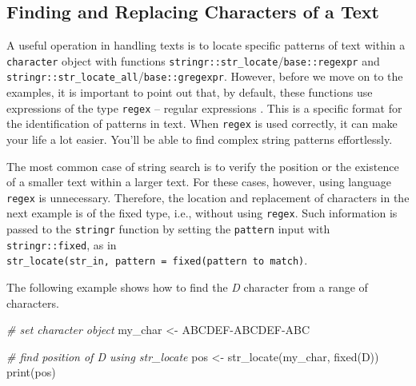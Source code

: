 \documentclass[
  12pt,
]{book}
\newenvironment{Shaded}{\begin{snugshade}}{\end{snugshade}}
\newcommand{\CommentTok}[1]{\textcolor[rgb]{0.37,0.37,0.37}{\textit{#1}}}
\newcommand{\FunctionTok}[1]{\textcolor[rgb]{0,0,0}{#1}}
\newcommand{\NormalTok}[1]{#1}
\newcommand{\OtherTok}[1]{\textcolor[rgb]{0.37,0.37,0.37}{#1}}
\newcommand{\StringTok}[1]{\textcolor[rgb]{0.5,0.5,0.5}{#1}}
\begin{document}
\hypertarget{finding-and-replacing-characters-of-a-text}{%
\subsection{Finding and Replacing Characters of a Text}\label{finding-and-replacing-characters-of-a-text}}

A useful operation in handling texts is to locate specific patterns of text within a \texttt{character} object with functions \texttt{stringr::str\_locate}/\texttt{base::regexpr} and \texttt{stringr::str\_locate\_all}/\texttt{base::gregexpr}. However, before we move on to the examples, it is important to point out that, by default, these functions use expressions of the type \texttt{regex} -- regular expressions \citep{thompson1968programming}. This is a specific format for the identification of patterns in text. When \texttt{regex} is used correctly, it can make your life a lot easier. You'll be able to find complex string patterns effortlessly.

The most common case of string search is to verify the position or the existence of a smaller text within a larger text. For these cases, however, using language \texttt{regex} is unnecessary. Therefore, the location and replacement of characters in the next example is of the fixed type, i.e., without using \texttt{regex}. Such information is passed to the \texttt{stringr} function by setting the \texttt{pattern} input with \texttt{stringr::fixed}, as in \texttt{str\_locate(str\_in,\ pattern\ =\ fixed(\textquotesingle{}pattern\ to\ match\textquotesingle{})}.      

The following example shows how to find the \emph{D} character from a range of characters.

\begin{Shaded}
\begin{Highlighting}[]
\CommentTok{\# set character object}
\NormalTok{my\_char }\OtherTok{\textless{}{-}} \StringTok{\textquotesingle{}ABCDEF{-}ABCDEF{-}ABC\textquotesingle{}}

\CommentTok{\# find position of \textquotesingle{}D\textquotesingle{} using str\_locate}
\NormalTok{pos }\OtherTok{\textless{}{-}} \FunctionTok{str\_locate}\NormalTok{(my\_char, }\FunctionTok{fixed}\NormalTok{(}\StringTok{\textquotesingle{}D\textquotesingle{}}\NormalTok{))}
\FunctionTok{print}\NormalTok{(pos)}
\end{Highlighting}
\end{Shaded}
\end{document}
